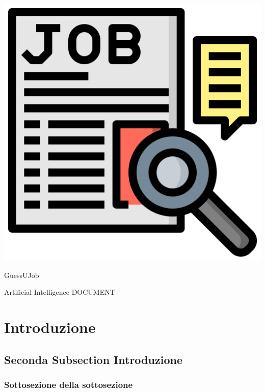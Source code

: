 \documentclass{article}
\begin{document}
\thispagestyle{empty}

\begin{center}%
    \includegraphics[scale=0.5]{job_seeking.png}

    \vspace{1cm}

    {\huge{GuessUJob}} %

    \vspace{0.5cm}

    {\large Artificial Intelligence DOCUMENT}
\end{center}

\newpage %

\tableofcontents

\newpage

\section{Introduzione}
\lipsum[3]
\lipsum[2]

\subsection{Seconda Subsection Introduzione}
\lipsum[1-3] %

\subsubsection{Sottosezione della sottosezione}
\lipsum[1]
\end{document}
